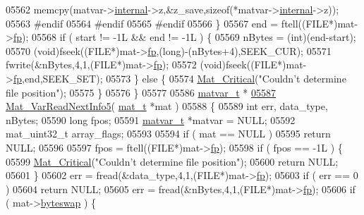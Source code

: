 \begin{DoxyCode}
{{{{{{{{{{{{{{{{{{{{{{{{{{{{{{{{{05562         memcpy(matvar->\hyperlink{group___m_a_t_a6e97e3ed9f40c49322c18561c2a94e92}{internal}->z,&z\_save,\textcolor{keyword}{sizeof}(*matvar->\hyperlink{group___m_a_t_a6e97e3ed9f40c49322c18561c2a94e92}{internal}->z));
05563 \textcolor{preprocessor}{#endif}
05564 \textcolor{preprocessor}{#endif}
05565 \textcolor{preprocessor}{#endif}
05566     \}
05567     end = ftell((FILE*)mat->\hyperlink{struct__mat__t_a85f562e407ca9ad4d2a6e14f839432b7}{fp});
05568     \textcolor{keywordflow}{if} ( start != -1L && end != -1L ) \{
05569         nBytes = (int)(end-start);
05570         (void)fseek((FILE*)mat->\hyperlink{struct__mat__t_a85f562e407ca9ad4d2a6e14f839432b7}{fp},(long)-(nBytes+4),SEEK\_CUR);
05571         fwrite(&nBytes,4,1,(FILE*)mat->\hyperlink{struct__mat__t_a85f562e407ca9ad4d2a6e14f839432b7}{fp});
05572         (void)fseek((FILE*)mat->\hyperlink{struct__mat__t_a85f562e407ca9ad4d2a6e14f839432b7}{fp},end,SEEK\_SET);
05573     \} \textcolor{keywordflow}{else} \{
05574         \hyperlink{group__mat__util_gaf51f2bfbb5580f575e4dd79757e2b80c}{Mat\_Critical}(\textcolor{stringliteral}{"Couldn't determine file position"});
05575     \}
05576 \}
05577 
05586 \hyperlink{group___m_a_t_structmatvar__t}{matvar\_t} *
\hyperlink{mat5_8c_a5defc934cf088b13347e50ea7f276ea3}{05587} \hyperlink{mat5_8c_a5defc934cf088b13347e50ea7f276ea3}{Mat\_VarReadNextInfo5}( \hyperlink{struct__mat__t}{mat\_t} *mat )
05588 \{
05589     \textcolor{keywordtype}{int} err, data\_type, nBytes;
05590     \textcolor{keywordtype}{long} fpos;
05591     \hyperlink{group___m_a_t_structmatvar__t}{matvar\_t} *matvar = NULL;
05592     mat\_uint32\_t array\_flags;
05593 
05594     \textcolor{keywordflow}{if} ( mat == NULL )
05595         \textcolor{keywordflow}{return} NULL;
05596 
05597     fpos = ftell((FILE*)mat->\hyperlink{struct__mat__t_a85f562e407ca9ad4d2a6e14f839432b7}{fp});
05598     \textcolor{keywordflow}{if} ( fpos == -1L ) \{
05599         \hyperlink{group__mat__util_gaf51f2bfbb5580f575e4dd79757e2b80c}{Mat\_Critical}(\textcolor{stringliteral}{"Couldn't determine file position"});
05600         \textcolor{keywordflow}{return} NULL;
05601     \}
05602     err = fread(&data\_type,4,1,(FILE*)mat->\hyperlink{struct__mat__t_a85f562e407ca9ad4d2a6e14f839432b7}{fp});
05603     \textcolor{keywordflow}{if} ( err == 0 )
05604         \textcolor{keywordflow}{return} NULL;
05605     err = fread(&nBytes,4,1,(FILE*)mat->\hyperlink{struct__mat__t_a85f562e407ca9ad4d2a6e14f839432b7}{fp});
05606     \textcolor{keywordflow}{if} ( mat->\hyperlink{struct__mat__t_a99d207977af5e04941ace56d71817a40}{byteswap} ) \{
}}}}}}}}}}}}}}}}}}}}}}}}}}}}}}}}}
\end{DoxyCode}
